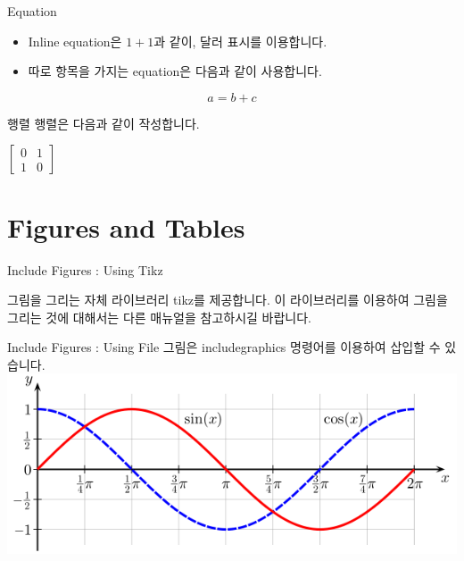 \documentclass{beamer}
\newenvironment{slide}[1][]
{%
  \begin{frame}[allowframebreaks,#1]%
  }{%
  \end{frame}%
}
\begin{document}
\begin{slide}[fragile, environment=slide]{Equation} 

\begin{itemize}
\item Inline equation은 $1+1$과 같이, 달러 표시를 이용합니다. 
\item 따로 항목을 가지는 equation은 다음과 같이 사용합니다. 
\end{itemize} 

\begin{equation} 
a = b+c
\end{equation}

\end{slide}

\begin{slide}[fragile, environment=slide]{행렬}
행렬은 다음과 같이 작성합니다. 

$ \left[ \begin{matrix}
0 & 1  \\
1 & 0 
\end{matrix} \right]$  
\end{slide}


\section{Figures and Tables} 

\begin{slide}[fragile, environment=slide]{Include Figures : Using Tikz} 

 그림을 그리는 자체 라이브러리 tikz를 제공합니다. 이 라이브러리를 이용하여 그림을 그리는 것에 대해서는 다른 매뉴얼을 참고하시길 바랍니다. 

\end{slide}

\begin{slide}[fragile, environment=slide]{Include Figures : Using File} 
그림은 includegraphics 명령어를 이용하여 삽입할 수 있습니다. 
\includegraphics[width=\textwidth]{cos}
\end{slide}
\end{document}
